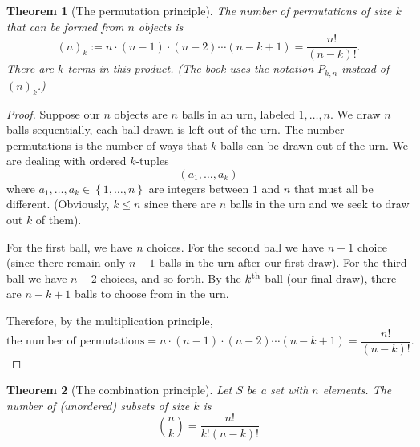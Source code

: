 \documentclass[10pt]{article}
\newtheorem{theorem}{Theorem}
\theoremstyle{definition}
\newcommand{\1}[1]{\textbf{1}_{\left[#1\right]}} %
\begin{document}
\begin{theorem}[The permutation principle]
  \label{thm:permutation-principle}
  The number of permutations of size $k$ that can be formed from $n$ objects
  is
  \begin{equation*}
    (n)_{k} := n\cdot (n-1)\cdot (n-2)\cdots (n-k+1) = \frac{n!}{(n-k)!}.
  \end{equation*}
  There are $k$ terms in this product. (The book uses the notation $P_{k,n}$
  instead of $(n)_{k}$.) 
\end{theorem}
\begin{proof}
  Suppose our $n$ objects are $n$ balls in an urn, labeled $1,\ldots,n$. We
  draw $n$ balls sequentially, each ball drawn is left out of the urn. The
  number permutations is the number of ways that $k$ balls can be drawn out of
  the urn. We are dealing with ordered $k$-tuples
  \begin{equation*}
    (a_{1},\ldots,a_{k})
  \end{equation*}
  where $a_{1},\ldots,a_{k}\in \left\{1,\ldots,n\right\}$ are integers between
  $1$ and $n$ that must all be different. (Obviously, $k \leq n$ since there
  are $n$ balls in the urn and we seek to draw out $k$ of them).

  For the first ball, we have $n$ choices. For the second ball we have $n-1$
  choice (since there remain only $n-1$ balls in the urn after our first
  draw). For the third ball we have $n-2$ choices, and so forth. By the
  $k^{\rm th}$ ball (our final draw), there are $n-k+1$ balls to choose from
  in the urn.

  Therefore, by the multiplication principle, 
  \begin{equation*}
    \text{the number of permutations} = n\cdot(n-1)\cdot(n-2)\cdots (n-k+1) = \frac{n!}{(n-k)!}.
  \end{equation*}
\end{proof}

\begin{theorem}[The combination principle]
  \label{thm:combination-principle}
  Let $S$ be a set with $n$ elements. The number of (unordered) subsets of size $k$ is
  \begin{equation*}
    {n\choose k} =  \frac{n!}{k!(n-k)!}
  \end{equation*} 
\end{theorem}
\end{document}
